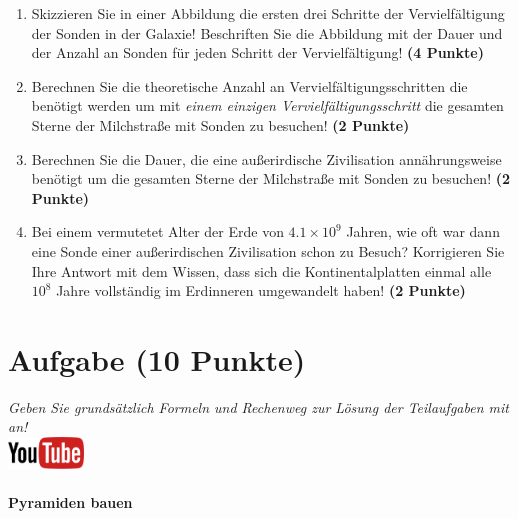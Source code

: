 \documentclass[a4paper, 9pt]{scrartcl}\usepackage[]{graphicx}\usepackage[]{xcolor}
\begin{document}
\begin{enumerate}
\item Skizzieren Sie in einer Abbildung die ersten drei Schritte der
  Vervielf{\"a}ltigung der Sonden in der Galaxie! Beschriften Sie die Abbildung
  mit der Dauer und der Anzahl an Sonden f{\"u}r jeden Schritt der Vervielf{\"a}ltigung! \textbf{(4 Punkte)}
\item Berechnen Sie die theoretische Anzahl an Vervielf{\"a}ltigungsschritten die
  ben{\"o}tigt werden um mit \textit{einem einzigen Vervielf{\"a}ltigungsschritt} die
  gesamten Sterne der Milchstra{\ss}e mit Sonden zu besuchen! \textbf{(2 Punkte)}
\item Berechnen Sie die Dauer, die eine au{\ss}erirdische Zivilisation
  ann{\"a}hrungsweise ben{\"o}tigt um die gesamten Sterne der Milchstra{\ss}e mit
  Sonden zu besuchen! \textbf{(2 Punkte)}
\item Bei einem vermutetet Alter der Erde von $\ensuremath{4.1\times 10^{9}}$ Jahren,
  wie oft war dann eine Sonde einer au{\ss}erirdischen Zivilisation schon zu
  Besuch? Korrigieren Sie Ihre Antwort mit dem Wissen, dass sich die
  Kontinentalplatten einmal alle $\ensuremath{10^{8}}$ Jahre vollst{\"a}ndig im
  Erdinneren umgewandelt haben! \textbf{(2 Punkte)}
\end{enumerate}


 
\clearpage

\section{Aufgabe \hfill (10 Punkte)}

\textit{Geben Sie grunds{\"a}tzlich Formeln und Rechenweg zur L{\"o}sung der
  Teilaufgaben mit an!} \\[1Ex]

\hfill\href{https://youtu.be/tDgr6fpkkYA}{\includegraphics[width =
  2cm]{img/youtube}} %
\hspace{2Ex}

\paragraph{Pyramiden bauen}
\end{document}
